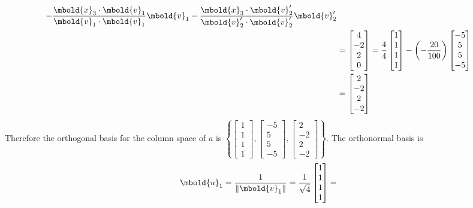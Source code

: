 \documentclass[12pt letter]{report}
\begin{document}
{\begin{align*}
    - \frac{\mbold{x}_3 \cdot \mbold{v}_1}{\mbold{v}_1 \cdot \mbold{v}_1} \mbold{v}_1
    - \frac{\mbold{x}_3 \cdot \mbold{v}^{\prime}_2}{\mbold{v}^{\prime}_2 \cdot \mbold{v}^{\prime}_2} \mbold{v}^{\prime}_2
    \\
                         & = \begin{bmatrix} 4 \\ -2\\ 2\\ 0 \end{bmatrix} = \frac{4}{4} \begin{bmatrix} 1 \\ 1\\ 1\\ 1 \end{bmatrix} - \left(
    -\frac{20}{100}\right) \begin{bmatrix} -5 \\ 5\\ 5\\ -5 \end{bmatrix}                                                                      \\
                         & = \begin{bmatrix} 2 \\ -2\\ 2\\ -2 \end{bmatrix}
  \end{align*}
  Therefore the orthogonal basis for the column space of $a$ is $\left\{ \begin{bmatrix} 1 \\ 1\\ 1\\ 1 \end{bmatrix},
    \begin{bmatrix} -5 \\ 5\\ 5\\ -5 \end{bmatrix}, \begin{bmatrix} 2 \\ -2\\ 2\\ -2 \end{bmatrix} \right\} $. The orthonormal basis is
  \begin{align*}
    \mbold{u}_1 & = \frac{1}{\|\mbold{v}_1\|} = \frac{1}{\sqrt{4}} \begin{bmatrix} 1 \\ 1\\ 1\\ 1 \end{bmatrix} =

\end{align*}}
\end{document}
